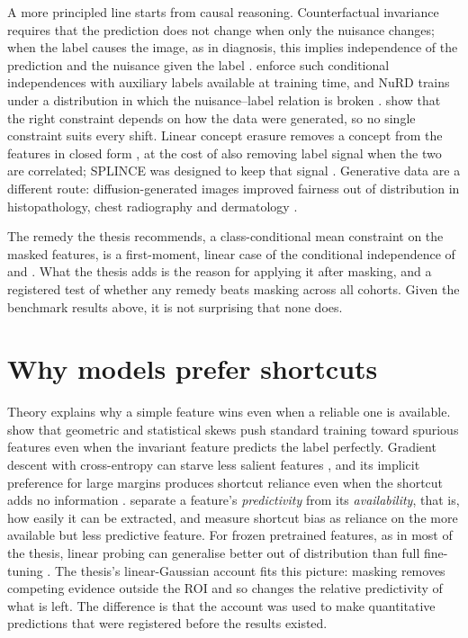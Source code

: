 \documentclass[11pt,a4paper]{article}
\begin{document}
A more principled line starts from causal reasoning. Counterfactual invariance requires that the prediction does not
change when only the nuisance changes; when the label causes the image, as in diagnosis, this implies independence of
the prediction and the nuisance given the label \citep{veitch2021counterfactual}. \citet{makar2022causally} enforce such
conditional independences with auxiliary labels available at training time, and NuRD trains under a distribution in
which the nuisance--label relation is broken \citep{puli2022nurd}. \citet{kaur2023modeling} show that the right
constraint depends on how the data were generated, so no single constraint suits every shift. Linear concept erasure
removes a concept from the features in closed form \citep{belrose2023leace}, at the cost of also removing label signal
when the two are correlated; SPLINCE was designed to keep that signal \citep{holstege2025splince}. Generative data are
a different route: diffusion-generated images improved fairness out of distribution in histopathology, chest
radiography and dermatology \citep{ktena2024generative}.

The remedy the thesis recommends, a class-conditional mean constraint on the masked features, is a first-moment, linear
case of the conditional independence of \citet{veitch2021counterfactual} and \citet{makar2022causally}. What the thesis
adds is the reason for applying it after masking, and a registered test of whether any remedy beats masking across all
cohorts. Given the benchmark results above, it is not surprising that none does.

\section{Why models prefer shortcuts}
Theory explains why a simple feature wins even when a reliable one is available. \citet{nagarajan2021understanding}
show that geometric and statistical skews push standard training toward spurious features even when the invariant
feature predicts the label perfectly. Gradient descent with cross-entropy can starve less salient features
\citep{pezeshki2021gradient}, and its implicit preference for large margins produces shortcut reliance even when the
shortcut adds no information \citep{puli2023dontblame}. \citet{hermann2024foundations} separate a feature's
\emph{predictivity} from its \emph{availability}, that is, how easily it can be extracted, and measure shortcut bias as
reliance on the more available but less predictive feature. For frozen pretrained features, as in most of the thesis,
linear probing can generalise better out of distribution than full fine-tuning \citep{kumar2022finetuning}. The
thesis's linear-Gaussian account fits this picture: masking removes competing evidence outside the ROI and so changes
the relative predictivity of what is left. The difference is that the account was used to make quantitative predictions
that were registered before the results existed.
\end{document}
